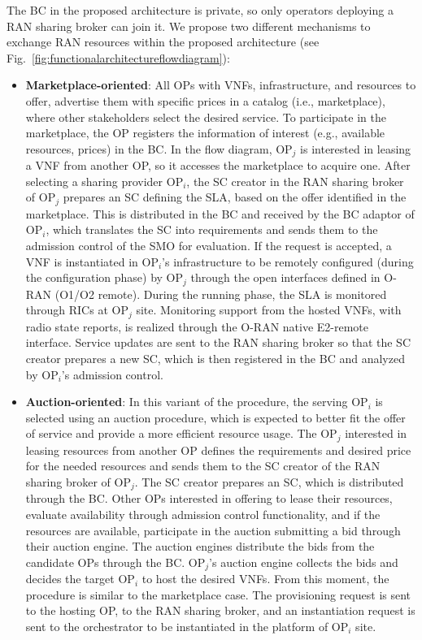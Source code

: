 \documentclass[journal]{IEEEtran}
\begin{document}
The BC in the proposed architecture is private, so only operators deploying a RAN sharing broker can join it. We propose two different mechanisms to exchange RAN resources within the proposed architecture (see Fig.~\ref{fig:functionalarchitectureflowdiagram}):
\begin{itemize}
    \item \textbf{Marketplace-oriented}: All OPs with VNFs, infrastructure, and resources to offer, advertise them with specific prices in a catalog (i.e., marketplace), where other stakeholders select the desired service. To participate in the marketplace, the OP registers the information of interest (e.g., available resources, prices) in the BC. In the flow diagram, OP$_j$ is interested in leasing a VNF from another OP, so it accesses the marketplace to acquire one. After selecting a sharing provider OP$_i$, the SC creator in the RAN sharing broker of OP$_j$ prepares an SC defining the SLA, based on the offer identified in the marketplace. This is distributed in the BC and received by the BC adaptor of OP$_i$, which translates the SC into requirements and sends them to the admission control of the SMO for evaluation. If the request is accepted, a VNF is instantiated in OP$_i$'s infrastructure to be remotely configured (during the configuration phase) by OP$_j$ through the open interfaces defined in O-RAN (O1/O2 remote). During the running phase, the SLA is monitored through RICs at OP$_j$ site. Monitoring support from the hosted VNFs, with radio state reports, is realized through the O-RAN native E2-remote interface. Service updates are sent to the RAN sharing broker so that the SC creator prepares a new SC, which is then registered in the BC and analyzed by OP$_i$'s admission control.
    \item \textbf{Auction-oriented}: In this variant of the procedure, the serving OP$_i$ is selected using an auction procedure, which is expected to better fit the offer of service and provide a more efficient resource usage. The OP$_j$ interested in leasing resources from another OP defines the requirements and desired price for the needed resources and sends them to the SC creator of the RAN sharing broker of OP$_j$. The SC creator prepares an SC, which is distributed through the BC. Other OPs interested in offering to lease their resources, evaluate availability through admission control functionality, and if the resources are available, participate in the auction submitting a bid through their auction engine. The auction engines distribute the bids from the candidate OPs through the BC. OP$_j$'s auction engine collects the bids and decides the target OP$_i$ to host the desired VNFs. From this moment, the procedure is similar to the marketplace case. The provisioning request is sent to the hosting OP, to the RAN sharing broker, and an instantiation request is sent to the orchestrator to be instantiated in the platform of  OP$_i$ site. 
\end{itemize}
\end{document}
